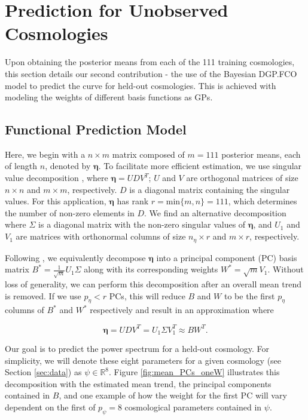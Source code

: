 \documentclass[11pt]{article}
\begin{document}
\section{Prediction for Unobserved Cosmologies}
\label{sec:pred}

Upon obtaining the posterior means from each of the 111 training cosmologies, this 
section details our second contribution - the use of the Bayesian DGP.FCO model 
to predict the curve for held-out cosmologies. This is achieved with modeling the 
weights of different basis functions as GPs.

\subsection{Functional Prediction Model}
\label{subsec:pca}

Here, we begin with a $n \times m$ matrix composed of $m=111$ posterior means, 
each of length $n$, denoted by $\boldsymbol\eta$. To facilitate more efficient estimation, 
we use singular value decomposition \citep[SVD; e.g.,][]{banerjee2014linear}, 
where $\boldsymbol\eta = UDV^T$; $U$ and $V$ are orthogonal matrices of size $n \times n$ 
and $m\times m$, respectively. $D$ is a diagonal matrix containing the singular values. 
For this application, $\boldsymbol\eta$ has rank $r=\text{min}\{m,n\}=111$, which 
determines the number of non-zero elements in $D$. We find an alternative decomposition 
where $\Sigma$ is a diagonal matrix with the non-zero singular values of $\boldsymbol\eta$, 
and $U_1$ and $V_1$ are matrices with orthonormal columns of size $n_\eta \times r$ 
and $m \times r$, respectively. 

Following \cite{higdon2008computer, higdon2010estcosmo}, we equivalently decompose 
$\boldsymbol\eta$ into a principal component (PC) basis matrix 
$B^* = \frac{1}{\sqrt{m}}U_1\Sigma$ along with its corresponding weights 
$W^* = \sqrt{m}V_1$. Without loss of generality, we can perform this decomposition 
after an overall mean trend is removed. If we use $p_\eta < r$ PCs, this will reduce 
$B$ and $W$ to be the first $p_\eta$ columns of $B^*$ and $W^*$ respectively and 
result in an approximation where 

\begin{equation}
    \boldsymbol\eta= UDV^T = U_1\Sigma V_1^T \approx BW^T.
\end{equation}

Our goal is to predict the power spectrum for a held-out cosmology. 
For simplicity, we will denote these eight parameters for a given cosmology (see 
Section \ref{sec:data}) as $\psi \in \mathbb{R}^8$. 
Figure \ref{fig:mean_PCs_oneW} illustrates this decomposition with the estimated 
mean trend, the principal components contained in $B$, and one example of how the 
weight for the first PC will vary dependent on the first of $p_\psi=8$ cosmological 
parameters contained in $\psi$.
\end{document}
